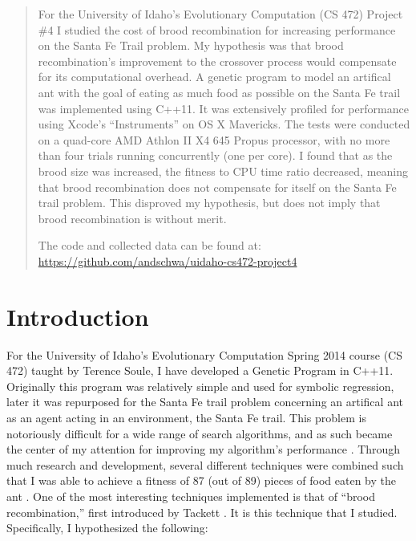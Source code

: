 \documentclass{acm_proc_article-sp}
\begin{document}
\maketitle
\begin{abstract}
For the University of Idaho's Evolutionary Computation (CS 472)
Project \#4 I studied the cost of brood recombination for increasing
performance on the Santa Fe Trail problem. My hypothesis was that
brood recombination's improvement to the crossover process would
compensate for its computational overhead. A genetic program to model
an artifical ant with the goal of eating as much food as possible on
the Santa Fe trail was implemented using C++11. It was extensively
profiled for performance using Xcode's ``Instruments'' on OS X
Mavericks. The tests were conducted on a quad-core AMD Athlon II X4
645 Propus processor, with no more than four trials running
concurrently (one per core). I found that as the brood size was
increased, the fitness to CPU time ratio decreased, meaning that brood
recombination does not compensate for itself on the Santa Fe trail
problem. This disproved my hypothesis, but does not imply that brood
recombination is without merit.

The code and collected data can be found at:
\url{https://github.com/andschwa/uidaho-cs472-project4}
\end{abstract}


\section{Introduction}
For the University of Idaho's Evolutionary Computation Spring 2014
course (CS 472) taught by Terence Soule, I have developed a Genetic
Program in C++11. Originally this program was relatively simple and
used for symbolic regression, later it was repurposed for the Santa Fe
trail problem concerning an artifical ant as an agent acting in an
environment, the Santa Fe trail. This problem is notoriously difficult
for a wide range of search algorithms, and as such became the center
of my attention for improving my algorithm's performance
\cite{Langdon:Hard}. Through much research and development, several
different techniques were combined such that I was able to achieve a
fitness of 87 (out of 89) pieces of food eaten by the ant
\cite{Schwartzmeyer:3}. One of the most interesting techniques
implemented is that of ``brood recombination,'' first introduced by
Tackett \cite{Tackett:Brood}. It is this technique that I
studied. Specifically, I hypothesized the following:
\end{document}
